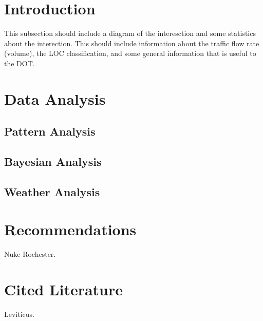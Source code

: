 \documentclass{report}
\begin{document}



\noindent
\section*{Introduction}

This subsection should include a diagram of the interesction and some statistics
about the interection. This should include information about the traffic flow
rate (volume), the LOC classification, and some general information that is
useful to the DOT.



\noindent
\section*{Data Analysis}

\subsection*{Pattern Analysis}
\subsection*{Bayesian Analysis}
\subsection*{Weather Analysis}

\noindent\section*{Recommendations}

Nuke Rochester.

\noindent
\section*{Cited Literature}

Leviticus.
\end{document}
